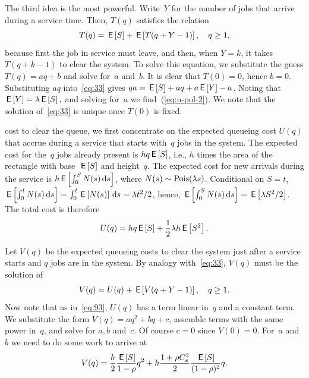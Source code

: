 \documentclass[queueing-book.tex]{subfiles}
\begin{document}
The third idea is the most powerful.
Write~$Y$ for the number of jobs that arrive during a service time.
Then, $T(q)$ satisfies the relation
\begin{equation}\label{eq:33}
  T(q) = \,\mathsf{E}\left[S\right] + \,\mathsf{E}\left[T(q+Y-1)\right],\quad q\geq 1,
\end{equation}
because first the job in service must leave, and then, when $Y=k$, it takes $T(q+k-1)$ to clear the system.
To solve this equation, we substitute the guess $T(q) = aq+b$ and solve for~$a$ and~$b$.
It is clear that $T(0)=0$, hence $b=0$.
Substituting $a q$ into~\cref{eq:33} gives $q a =\,\mathsf{E}\left[S\right] + aq + a\,\mathsf{E}\left[Y\right] - a$.
Noting that $\,\mathsf{E}\left[Y\right] = \lambda \,\mathsf{E}\left[S\right],$ and solving for~$a$ we find~(\cref{eq:n-pol-2}).
We note that the solution of~\cref{eq:33} is unique once $T(0)$ is fixed.




 cost to clear the queue, we first concentrate on the expected queueing cost $U(q)$ that accrue during a service that starts with~$q$ jobs in the system.
The expected cost for the~$q$ jobs already present is $h q \,\mathsf{E}\left[S\right]$, i.e., $h$ times the area of the rectangle with base~$\,\mathsf{E}\left[S\right]$ and height~$q$.
The expected cost for new arrivals during the service is $h \,\mathsf{E}\left[\int_0^{S} N(s) \,\textrm{d}s\right]$, where $N(s)\sim \mathrm{Pois}(\lambda s)$.
Conditional on $S=t$, $\,\mathsf{E}\left[\int_0^{t} N(s) \,\textrm{d}s \right] = \int_{0}^{t} \,\mathsf{E}\left[N(s)\right] \,\textrm{d}s = \lambda t^2/2$, hence, $\,\mathsf{E}\left[\int_0^{S} N(s) \,\textrm{d}s\right] = \,\mathsf{E}\left[\lambda S^{2}/2\right]$.
The total cost is therefore
\begin{equation*}
U(q)  =  h q \,\mathsf{E}\left[S\right] +  \frac 12 \lambda h \,\mathsf{E}\left[S^2\right].
\end{equation*}

Let $V(q)$ be the expected queueing costs to clear the system just after a service starts and  $q$ jobs are in the system.
By analogy with~\cref{eq:33}, $V(q)$ must be the solution of
\begin{equation}  \label{eq:98}
  V(q) = U(q) + \,\mathsf{E}\left[V(q+Y-1)\right], \quad q\geq 1.
\end{equation}
Now note that as in~\cref{eq:93}, $U(q)$ has a term linear in~$q$ and a constant term.
We substitute the form $V(q) = aq^2 + bq+c$, assemble terms with the same power in~$q$, and solve for $a, b$ and~$c$.
Of course $c = 0$ since $V(0)=0$.
For~$a$ and~$b$ we need to do some work to arrive at
\begin{align*}
  V(q) = \frac{h}{2}\frac{\,\mathsf{E}\left[S\right]}{1-\rho} q^2 + h  \frac{ 1+ \rho C_s^2}2 \frac{\,\mathsf{E}\left[S\right]}{(1-\rho)^2} q.
\end{align*}
\end{document}
